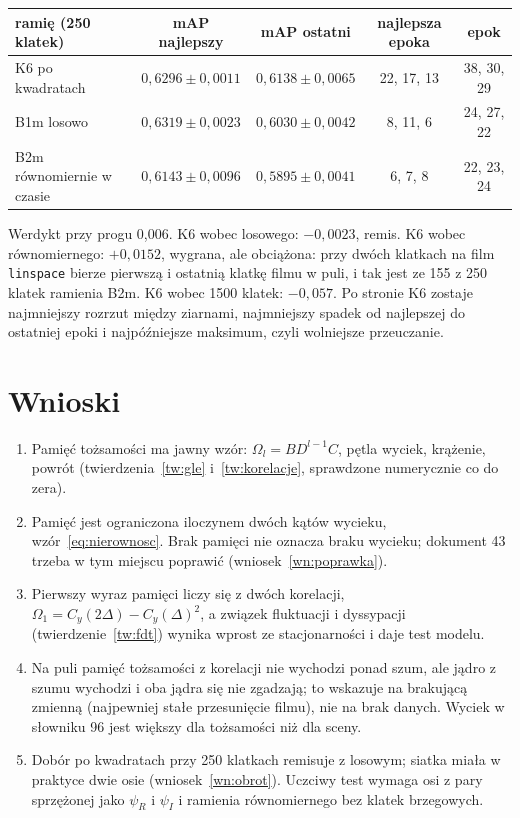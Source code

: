\documentclass[11pt,a4paper]{article}
\theoremstyle{definition}
\theoremstyle{remark}
\begin{document}
\begin{center}
\begin{tabular}{@{}lcccc@{}}
\toprule
ramię (250 klatek) & mAP najlepszy & mAP ostatni & najlepsza epoka & epok\\
\midrule
K6 po kwadratach & $0{,}6296 \pm 0{,}0011$ & $0{,}6138 \pm 0{,}0065$ & 22, 17, 13 & 38, 30, 29\\
B1m losowo & $0{,}6319 \pm 0{,}0023$ & $0{,}6030 \pm 0{,}0042$ & 8, 11, 6 & 24, 27, 22\\
B2m równomiernie w czasie & $0{,}6143 \pm 0{,}0096$ & $0{,}5895 \pm 0{,}0041$ & 6, 7, 8 & 22, 23, 24\\
\bottomrule
\end{tabular}
\end{center}

Werdykt przy progu 0,006. K6 wobec losowego: $-0{,}0023$, remis. K6 wobec równomiernego: $+0{,}0152$,
wygrana, ale obciążona: przy dwóch klatkach na film \texttt{linspace} bierze pierwszą i ostatnią klatkę filmu
w puli, i tak jest ze 155 z 250 klatek ramienia B2m. K6 wobec 1500 klatek: $-0{,}057$. Po stronie K6 zostaje
najmniejszy rozrzut między ziarnami, najmniejszy spadek od najlepszej do ostatniej epoki i najpóźniejsze
maksimum, czyli wolniejsze przeuczanie.

\section{Wnioski}

\begin{enumerate}
\item Pamięć tożsamości ma jawny wzór: $\Omega_l = BD^{l-1}C$, pętla wyciek, krążenie, powrót
(twierdzenia~\ref{tw:gle} i~\ref{tw:korelacje}, sprawdzone numerycznie co do zera).
\item Pamięć jest ograniczona iloczynem dwóch kątów wycieku, wzór~\eqref{eq:nierownosc}. Brak pamięci
nie oznacza braku wycieku; dokument 43 trzeba w tym miejscu poprawić (wniosek~\ref{wn:poprawka}).
\item Pierwszy wyraz pamięci liczy się z dwóch korelacji, $\Omega_1 = C_y(2\Delta)-C_y(\Delta)^2$, a związek
fluktuacji i dyssypacji (twierdzenie~\ref{tw:fdt}) wynika wprost ze stacjonarności i daje test modelu.
\item Na puli pamięć tożsamości z korelacji nie wychodzi ponad szum, ale jądro z szumu wychodzi i oba
jądra się nie zgadzają; to wskazuje na brakującą zmienną (najpewniej stałe przesunięcie filmu), nie na brak danych.
Wyciek w słowniku 96 jest większy dla tożsamości niż dla sceny.
\item Dobór po kwadratach przy 250 klatkach remisuje z losowym; siatka miała w praktyce dwie osie
(wniosek~\ref{wn:obrot}). Uczciwy test wymaga osi z pary sprzężonej jako $\psi_R$ i $\psi_I$
i ramienia równomiernego bez klatek brzegowych.
\end{enumerate}
\end{document}

